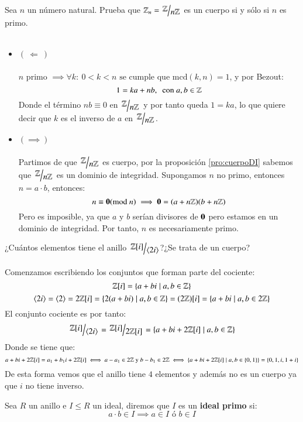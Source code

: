 \begin{ex}[H1.5]
    Sea $n$ un número natural. Prueba que $\Z_n = \ZnZ$ es un cuerpo si y sólo si $n$ es primo.\\\\
    \begin{itemize}
        \item $\left(\ \Longleftarrow\ \right)$\\\\
        $ n $ primo $ \implies \forall k:\ 0 < k < n \text{ se cumple que } \mathrm{mcd}(k, n) = 1$, y por Bezout:
        $$
            1 = ka + nb,\ \text{ con } a, b \in \mathbb{Z}
        $$
        Donde el término $nb \equiv 0$ en $\ZnZ$ y por tanto queda $1 = ka$, lo que quiere decir que $k$ es el inverso de $a$ en $\ZnZ$.
        \item $\left(\implies\right)$\\\\
        Partimos de que $\ZnZ$ es cuerpo, por la proposición \ref{pro:cuerpoDI} sabemos que $\ZnZ$ es un dominio de integridad. Supongamos $n$ no primo, entonces $n = a\cdot b$, entonces:
        $$
            n \equiv \mathbf{0} (\mathrm{mod}\ n) \implies \mathbf{0} = (a + n\mathbb{Z})(b + n\mathbb{Z})
        $$
        Pero es imposible, ya que $a$ y $b$ serían divisores de $\mathbf{0}$ pero estamos en un dominio de integridad. Por tanto, $n$ es necesariamente primo.
    \end{itemize}
\end{ex}

\begin{ex}[H1.12]
    ¿Cuántos elementos tiene el anillo $\quo{\Z[i]}{\gen{2i}}$?¿Se trata de un cuerpo?\\\\
    Comenzamos escribiendo los conjuntos que forman parte del cociente:
    $$
        \mathbb{Z}[i] = \left\{a + bi \mid a, b \in \mathbb{Z}\right\}
    $$
    $$
        \langle2i\rangle = \langle2\rangle = 2\mathbb{Z}[i] = \left\{2(a+bi) \mid a,b \in \mathbb{Z}\right\} = (2\mathbb{Z})[i] = \left\{a + bi \mid a, b \in 2\mathbb{Z}\right\}
    $$
    El conjunto cociente es por tanto:
    $$
        \quo{\Z[i]}{\gen{2i}} = \quo{\Z[i]}{2\Z[i]} = \left\{ a+bi + 2\Z[i] \mid a, b \in \Z \right\}
    $$
    Donde se tiene que:
    $$
        a + bi + 2\mathbb{Z}[i] = a_1 + b_1i + 2\mathbb{Z}[i] \iff a-a_1 \in 2\mathbb{Z} \text{ y } b-b_1 \in 2\mathbb{Z} \iff \left\{a+bi+2\mathbb{Z}[i] \mid a, b \in \left\{0, 1\right\}\right\} = \left\{0, 1, i, 1+i\right\}
    $$
    De esta forma vemos que el anillo tiene $4$ elementos y además no es un cuerpo ya que $i$ no tiene inverso.
\end{ex}

\begin{dfn}
    Sea $R$ un anillo e $I \leq R$ un ideal, diremos que $I$ es un \textbf{ideal primo} si:
    $$
        a\cdot b \in I \implies a \in I \text{ ó } b \in I
    $$
\end{dfn}

